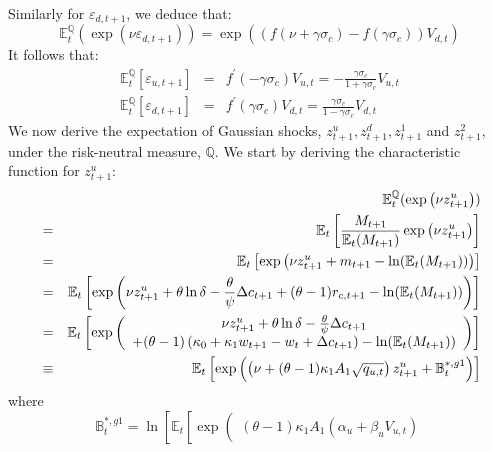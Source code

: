 \documentclass[11pt]{article}
\begin{document}
\begin{small}
Similarly for $\varepsilon_{d,t+1}$, we deduce that:%
\begin{equation*}
\mathbb{E}_{t}^{\mathbb{Q}}(\exp \left( \nu\varepsilon _{d,t+1}\right)
)=\exp \left( \left( f(\nu+\gamma \sigma _{c})-f(\gamma \sigma _{c})\right)
V_{d,t}\right)
\end{equation*}%
It follows that:%
\begin{eqnarray*}
\mathbb{E}_{t}^{\mathbb{Q}}\left[ \varepsilon _{u,t+1}\right] &=&f^{\prime
}(-\gamma \sigma _{c})V_{u,t}=-\frac{\gamma \sigma _{c}}{1+\gamma \sigma _{c}%
}V_{u,t} \\
\mathbb{E}_{t}^{\mathbb{Q}}\left[ \varepsilon _{d,t+1}\right] &=&f^{\prime
}(\gamma \sigma _{c})V_{d,t}=\frac{\gamma \sigma _{c}}{1-\gamma \sigma _{c}}%
V_{d,t}
\end{eqnarray*}
We now derive the expectation of Gaussian shocks, $z^u_{t+1}, z^d_{t+1},
z^1_{t+1}$ and $z^2_{t+1}$, under the risk-neutral measure, $\mathbb{Q}$. We
start by deriving the characteristic function for $z^u_{t+1}$:
\begin{eqnarray*}
&&\mathbb{E}_{t}^{\mathbb{Q}}(\exp \left( \nu z_{t+1}^{u}\right) ) \\
&=&\mathbb{E}_{t}\left[ \frac{M_{t+1}}{\mathbb{E}_{t}(M_{t+1})}\exp \left(
\nu z_{t+1}^{u}\right) \right] \\
&=&\mathbb{E}_{t}\left[ \exp \left( \nu z_{t+1}^{u}+m_{t+1}-\ln (\mathbb{E}%
_{t}(M_{t+1}))\right) \right] \\
&=&\mathbb{E}_{t}\left[ \exp \left( \nu z_{t+1}^{u}+\theta \ln \delta -\frac{%
\theta }{\psi }\Delta c_{t+1}+(\theta -1)r_{c,t+1}-\ln (\mathbb{E}%
_{t}(M_{t+1}))\right) \right] \\
&=&\mathbb{E}_{t}\left[ \exp \left(
\begin{array}{c}
\nu z_{t+1}^{u}+\theta \ln \delta -\frac{\theta }{\psi }\Delta c_{t+1} \\
+(\theta -1)\left( \kappa _{0}+\kappa _{1}w_{t+1}-w_{t}+\Delta
c_{t+1}\right) -\ln (\mathbb{E}_{t}(M_{t+1}))%
\end{array}%
\right) \right] \\
&\equiv&\mathbb{E}_{t}\left[ \exp \left( \left( \nu+(\theta -1)\kappa _{1}A_{1}%
\sqrt{q_{u,t}}\right) z_{t+1}^{u}+\mathbb{B}^{*,g1}_{t}\right) \right]
\end{eqnarray*}%
where%
\begin{equation*}
\mathbb{B}^{*,g1}_{t}=\ln \left[ \mathbb{E}_{t}\left[ \exp \left(
\begin{array}{c}
(\theta -1)\kappa _{1}A_{1}\left( \alpha _{u}+\beta _{u}V_{u,t}\right)

\end{array}
\end{equation*}
\end{small}
\end{document}
